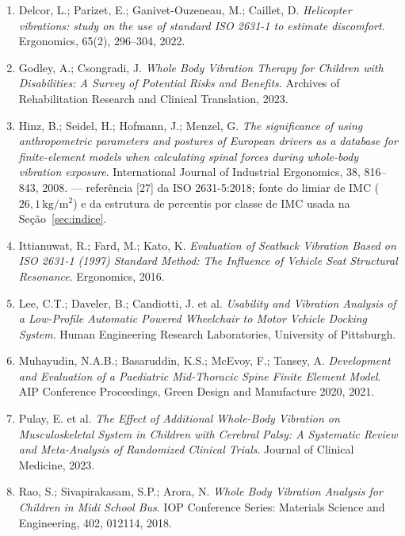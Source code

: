 \documentclass[11pt,a4paper]{article}
\newcommand{\unit}[2]{\ensuremath{#1\,\mathrm{#2}}}
\begin{document}
\begin{enumerate}
{      Long-Term Exposure Assessment Methodologies Defined in ISO 2631-1 and
      ISO 2631-5}. International Journal of Environmental Research and Public
      Health, 19, 5206, 2022.
\item Delcor, L.; Parizet, E.; Ganivet-Ouzeneau, M.; Caillet, D.
      \emph{Helicopter vibrations: study on the use of standard ISO 2631-1 to
      estimate discomfort}. Ergonomics, 65(2), 296--304, 2022.
\item Godley, A.; Csongradi, J. \emph{Whole Body Vibration Therapy for
      Children with Disabilities: A Survey of Potential Risks and Benefits}.
      Archives of Rehabilitation Research and Clinical Translation, 2023.
\item Hinz, B.; Seidel, H.; Hofmann, J.; Menzel, G. \emph{The significance of
      using anthropometric parameters and postures of European drivers as a
      database for finite-element models when calculating spinal forces
      during whole-body vibration exposure}. International Journal of
      Industrial Ergonomics, 38, 816--843, 2008. --- referência [27] da ISO
      2631-5:2018; fonte do limiar de IMC (\unit{26{,}1}{kg/m^2}) e da
      estrutura de percentis por classe de IMC usada na
      Seção~\ref{sec:indice}.
\item Ittianuwat, R.; Fard, M.; Kato, K. \emph{Evaluation of Seatback
      Vibration Based on ISO 2631-1 (1997) Standard Method: The Influence of
      Vehicle Seat Structural Resonance}. Ergonomics, 2016.
\item Lee, C.T.; Daveler, B.; Candiotti, J. et al. \emph{Usability and
      Vibration Analysis of a Low-Profile Automatic Powered Wheelchair to
      Motor Vehicle Docking System}. Human Engineering Research Laboratories,
      University of Pittsburgh.
\item Muhayudin, N.A.B.; Basaruddin, K.S.; McEvoy, F.; Tansey, A.
      \emph{Development and Evaluation of a Paediatric Mid-Thoracic Spine
      Finite Element Model}. AIP Conference Proceedings, Green Design and
      Manufacture 2020, 2021.
\item Pulay, E. et al. \emph{The Effect of Additional Whole-Body Vibration on
      Musculoskeletal System in Children with Cerebral Palsy: A Systematic
      Review and Meta-Analysis of Randomized Clinical Trials}. Journal of
      Clinical Medicine, 2023.
\item Rao, S.; Sivapirakasam, S.P.; Arora, N. \emph{Whole Body Vibration
      Analysis for Children in Midi School Bus}. IOP Conference Series:
      Materials Science and Engineering, 402, 012114, 2018.

\end{enumerate}
\end{document}
